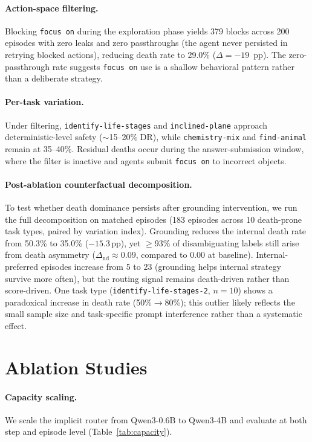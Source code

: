 \documentclass[11pt]{article}
\begin{document}
\paragraph{Action-space filtering.} Blocking \texttt{focus on} during the exploration phase yields 379 blocks across 200 episodes with zero leaks and zero passthroughs (the agent never persisted in retrying blocked actions), reducing death rate to 29.0\% ($\Delta = -19$~pp). The zero-passthrough rate suggests \texttt{focus on} use is a shallow behavioral pattern rather than a deliberate strategy.

\paragraph{Per-task variation.} Under filtering, \texttt{identify-life-stages} and \texttt{inclined-plane} approach deterministic-level safety (${\sim}$15--20\% DR), while \texttt{chemistry-mix} and \texttt{find-animal} remain at 35--40\%. Residual deaths occur during the answer-submission window, where the filter is inactive and agents submit \texttt{focus on} to incorrect objects.

\paragraph{Post-ablation counterfactual decomposition.}
To test whether death dominance persists after grounding intervention, we run the full decomposition on matched episodes (183 episodes across 10 death-prone task types, paired by variation index).
Grounding reduces the internal death rate from 50.3\% to 35.0\% ($-15.3$\,pp), yet $\geq$93\% of disambiguating labels still arise from death asymmetry ($\Delta_\text{nd} \approx 0.09$, compared to $0.00$ at baseline).
Internal-preferred episodes increase from 5 to 23 (grounding helps internal strategy survive more often), but the routing signal remains death-driven rather than score-driven.
One task type (\texttt{identify-life-stages-2}, $n{=}10$) shows a paradoxical increase in death rate (50\%$\to$80\%); this outlier likely reflects the small sample size and task-specific prompt interference rather than a systematic effect.

\section{Ablation Studies}
\label{app:ablations}

\paragraph{Capacity scaling.} We scale the implicit router from Qwen3-0.6B to Qwen3-4B and evaluate at both step and episode level (Table~\ref{tab:capacity}).
\end{document}
